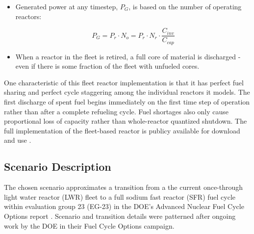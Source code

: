 \documentclass{style}
\begin{document}
\begin{itemize}
    \item Generated power at any timestep, $P_G$, is based on the number of
      operating reactors:

      \begin{equation}
        P_{G} = P_r \cdot N_o = P_r \cdot N_r \cdot \frac{C_{inv}}{C_{cap}}
      \end{equation}

    \item When a reactor in the fleet is retired, a full core of material is
        discharged - even if there is some fraction of the fleet with unfueled
        cores.
        
\end{itemize}

One characteristic of this fleet reactor implementation is that it has perfect
fuel sharing and perfect cycle staggering among the individual reactors it
models.  The first discharge of spent fuel begins immediately on
the first time step of operation rather than after a complete refueling cycle.
Fuel shortages also only cause proportional loss of capacity rather than
whole-reactor quantized shutdown.  The full implementation of the fleet-based
reactor is publicy available for download and use \cite{Carlsen2015}.

\subsection{Scenario Description}

The chosen scenario approximates a transition from a the current once-through light water
reactor (LWR) fleet to a full sodium fast reactor (SFR) fuel cycle within evaluation group 23 (EG-23)
in the DOE's Advanced Nuclear Fuel Cycle Options report
\cite{wigeland_nuclear_2014}. Scenario and transition details were patterned
after ongoing work by the DOE in their Fuel Cycle Options campaign.
\end{document}
